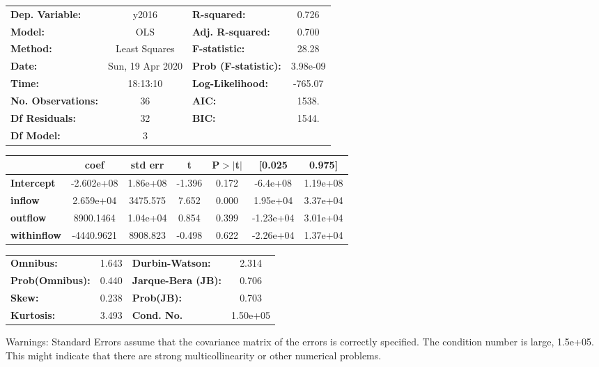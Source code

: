 \begin{center}
\begin{tabular}{lclc}
\toprule
\textbf{Dep. Variable:}    &      y2016       & \textbf{  R-squared:         } &     0.726   \\
\textbf{Model:}            &       OLS        & \textbf{  Adj. R-squared:    } &     0.700   \\
\textbf{Method:}           &  Least Squares   & \textbf{  F-statistic:       } &     28.28   \\
\textbf{Date:}             & Sun, 19 Apr 2020 & \textbf{  Prob (F-statistic):} &  3.98e-09   \\
\textbf{Time:}             &     18:13:10     & \textbf{  Log-Likelihood:    } &   -765.07   \\
\textbf{No. Observations:} &          36      & \textbf{  AIC:               } &     1538.   \\
\textbf{Df Residuals:}     &          32      & \textbf{  BIC:               } &     1544.   \\
\textbf{Df Model:}         &           3      & \textbf{                     } &             \\
\bottomrule
\end{tabular}
\begin{tabular}{lcccccc}
                    & \textbf{coef} & \textbf{std err} & \textbf{t} & \textbf{P$> |$t$|$} & \textbf{[0.025} & \textbf{0.975]}  \\
\midrule
\textbf{Intercept}  &   -2.602e+08  &     1.86e+08     &    -1.396  &         0.172        &     -6.4e+08    &     1.19e+08     \\
\textbf{inflow}     &    2.659e+04  &     3475.575     &     7.652  &         0.000        &     1.95e+04    &     3.37e+04     \\
\textbf{outflow}    &    8900.1464  &     1.04e+04     &     0.854  &         0.399        &    -1.23e+04    &     3.01e+04     \\
\textbf{withinflow} &   -4440.9621  &     8908.823     &    -0.498  &         0.622        &    -2.26e+04    &     1.37e+04     \\
\bottomrule
\end{tabular}
\begin{tabular}{lclc}
\textbf{Omnibus:}       &  1.643 & \textbf{  Durbin-Watson:     } &    2.314  \\
\textbf{Prob(Omnibus):} &  0.440 & \textbf{  Jarque-Bera (JB):  } &    0.706  \\
\textbf{Skew:}          &  0.238 & \textbf{  Prob(JB):          } &    0.703  \\
\textbf{Kurtosis:}      &  3.493 & \textbf{  Cond. No.          } & 1.50e+05  \\
\bottomrule
\end{tabular}
\end{center}

Warnings: \newline
 [1] Standard Errors assume that the covariance matrix of the errors is correctly specified. \newline
 [2] The condition number is large, 1.5e+05. This might indicate that there are \newline
 strong multicollinearity or other numerical problems.